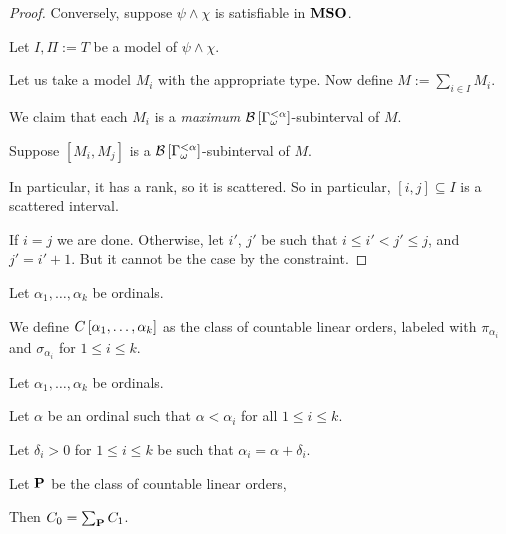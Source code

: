 \begin{proof}
  Conversely, suppose $\psi \land \chi$ is satisfiable in $\mathbf{MSO}$.

  Let $I, \Pi := T$ be a model of $\psi \land \chi$.

  Let us take a model $M_i$ with the appropriate type.
  Now define $M := \sum_{i \in I} M_i$.

  We claim that each $M_i$ is a \emph{maximum} $\mathcal{B} \left[ {{\Gamma_{\omega}^{< \alpha}}} \right]$-subinterval
  of $M$.

  Suppose $[M_i, M_j]$ is a $\mathcal{B} \left[ {{\Gamma_{\omega}^{< \alpha}}} \right]$-subinterval of $M$.

  In particular, it has a rank, so it is scattered. So in particular,
  $[i, j] \subseteq I$ is a scattered interval.

  If $i = j$ we are done. Otherwise, let $i'$, $j'$ be such that $i \le i' < j' \le j$,
  and $j' = i' + 1$.  But it cannot be the case by the constraint.


\end{proof}

\begin{definition}
  Let $\alpha_1, \ldots, \alpha_k$ be ordinals.

  We define $C \left[ {\alpha_1, \ldots, \alpha_k} \right]$ as the class of 
  countable linear orders, labeled with
  $\pi_{\alpha_i}$ and $\sigma_{\alpha_i}$ for $1 \le i \le k$.
\end{definition}

\begin{theorem}
  Let $\alpha_1, \ldots, \alpha_k$ be ordinals.

  Let $\alpha$ be an ordinal such that $\alpha < \alpha_i$
  for all $1 \le i \le k$.

  Let $\delta_i > 0$ for $1 \le i \le k$ be such that
  $\alpha_i = \alpha + \delta_i$.


  
  Let $\mathbf{P}$ be the class of countable linear orders,

  Then $C_0 = \sum_{\mathbf{P}}{C_1}$.

\end{theorem}
